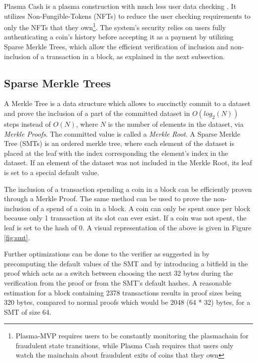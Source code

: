 Plasma Cash is a plasma construction with much less user data checking \cite{plasma_cash}. It
utilizes Non-Fungible-Tokens (NFTs) to reduce the
user checking requirements to only the NFTs that they own\footnote{Plasma-MVP requires users to be constantly monitoring the plasmachain for fraudulent state transitions, while Plasma Cash requires that users only watch the mainchain about fraudulent exits of coins that they own}. The system's security relies on users fully authenticating a coin's history before accepting it as a payment by utilizing Sparse Merkle Trees, which allow the efficient verification of inclusion and non-inclusion of a transaction in a block, as explained in the next subsection.

\subsection{Sparse Merkle Trees} 

A Merkle Tree is a data structure which allows to succinctly commit to a dataset and prove the inclusion of a part of the committed dataset in $O(log_2(N))$ steps instead of $O(N)$, where $N$ is the number of elements in the dataset, via \textit{Merkle Proofs}. The committed value is called a \textit{Merkle Root}. A Sparse Merkle Tree (SMTs) \cite{sparse_merkle_trees} is an ordered merkle tree, where each element of the dataset is placed at the leaf with the index corresponding the element's index in the dataset. If an element of the dataset was not included in the Merkle Root, its leaf is set to a special default value. 

The inclusion of a transaction spending a coin in a block can be efficiently proven through a Merkle Proof. The same method can be used to prove the non-inclusion of a spend of a coin in a block. A coin can only be spent once per block because only 1 transaction at its slot can ever exist. If a coin was not spent, the leaf is set to the hash of 0. A visual representation of the above is given in Figure \ref{fig:smt}.



Further optimizations can be done to the verifier
as suggested in \cite{smt_compact_proofs} by precomputing the default values of
the SMT and by introducing a bitfield in the proof which acts as a
switch between choosing the next 32 bytes during the verification from the
proof or from the SMT's default hashes. A reasonable estimation for a block
containing 2378 transactions results in proof sizes being 320 bytes, compared
to normal proofs which would be 2048 (64 * 32) bytes, for a SMT of size 64.

